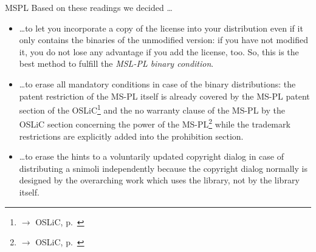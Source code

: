 \begin{license}{MSPL}
Based on these readings we decided \ldots

\label{MsplSourceBinHint} 
\begin{itemize}
  \item \ldots to let you incorporate a copy of the license into your
  distribution even if it only contains the binaries of the unmodified version:
  if you have not modified it, you do not lose any advantage if you add the
  license, too. So, this is the best method to fulfill the \emph{MSL-PL binary
  condition}.
  \item \ldots to erase all mandatory conditions in case of the binary
  distributions: the patent restriction of the MS-PL itself is already covered
  by the MS-PL patent section of the OSLiC\footnote{$\rightarrow$ OSLiC, p.\
  } and the no warranty clause of the MS-PL by
  the OSLiC section concerning the power of the MS-PL\footnote{$\rightarrow$
  OSLiC, p.\ \protectionpageref{MSPL}} while the trademark
  restrictions are explicitly added into the prohibition section.
  \item \ldots to erase the hints to a voluntarily updated copyright dialog in
  case of distributing a snimoli independently because the copyright dialog
  normally is designed by the overarching work which uses the library, not by
  the library itself.
\end{itemize}

\end{license}

%

